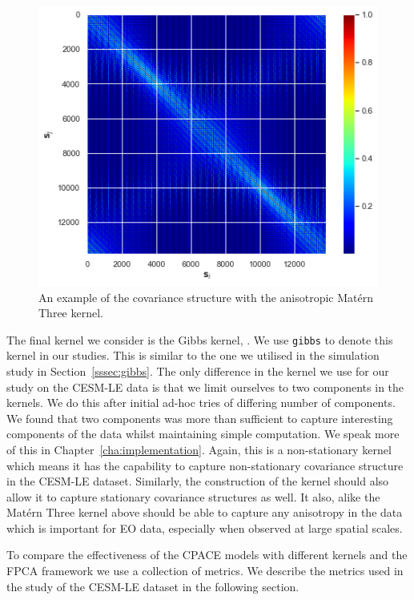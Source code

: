 \begin{figure}[h]
	\centering
	\includegraphics[width=\textwidth]{matern_aniso_ex}
	\caption[An example of the covariance structure with the anisotropic Mat\'ern Three kernel.]{An example of the covariance structure with the anisotropic Mat\'ern Three kernel.}
	\label{fig:matern_aniso}
\end{figure}

The final kernel we consider is the Gibbs kernel, \citep{gibbs_bayesian_1998}.
We use \verb*|gibbs| to denote this kernel in our studies.
This is similar to the one we utilised in the simulation study in Section~\ref{sssec:gibbs}. 
The only difference in the kernel we use for our study on the CESM-LE data is that we limit ourselves to two components in the kernels.
We do this after initial ad-hoc tries of differing number of components. 
We found that two components was more than sufficient to capture interesting components of the data whilst maintaining simple computation.
We speak more of this in Chapter~\ref{cha:implementation}.
Again, this is a non-stationary kernel which means it has the capability to capture non-stationary covariance structure in the CESM-LE dataset. 
Similarly, the construction of the kernel should also allow it to capture stationary covariance structures as well.
It also, alike the Mat\'ern Three kernel above should be able to capture any anisotropy in the data which is important for EO data, especially when observed at large spatial scales.

To compare the effectiveness of the CPACE models with different kernels and the FPCA framework we use a collection of metrics. 
We describe the metrics used in the study of the CESM-LE dataset in the following section. 

